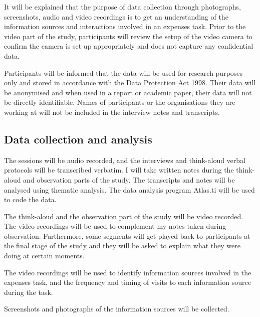 It will be explained that the purpose of data collection through photographs, screenshots, audio and video recordings  is to get an understanding of the information sources and interactions involved in an expenses task. Prior to the video part of the study, participants will review the setup of the video camera to confirm the camera is set up appropriately and does not capture any confidential data.

Participants will be informed that the data will be used for research purposes only and stored in accordance with the Data Protection Act 1998. Their data will be anonymised and when used in a report or academic paper, their data will not be directly identifiable. Names of participants or the organisations they are working at will not be included in the interview notes and transcripts.

\subsection{Data collection and analysis}
The sessions will be audio recorded, and the interviews and think-aloud verbal protocols will be transcribed verbatim. I will take written notes during the think-aloud and observation parts of the study. The transcripts and notes will be analysed using thematic analysis. The data analysis program Atlas.ti will be used to code the data. 

The think-aloud and the observation part of the study will be video recorded. The video recordings will be used to complement my notes taken during observation. Furthermore, some segments will get played back to participants at the final stage of the study and they will be asked to explain what they were doing at certain moments.

The video recordings will be used to identify information sources involved in the expenses task, and the frequency and timing of visits to each information source during the task.

Screenshots and photographs of the information sources will be collected.

